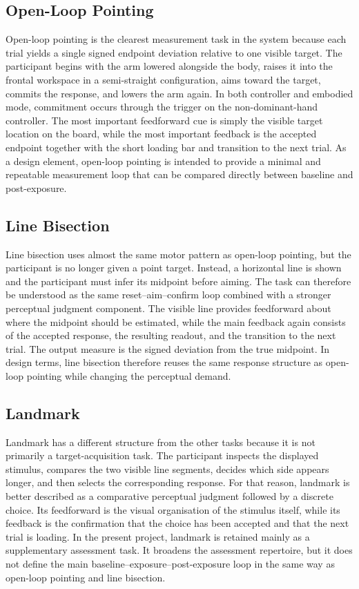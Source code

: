 \subsection{Open-Loop Pointing}
\label{subsec:open-loop-decomposition}

Open-loop pointing is the clearest measurement task in the system because each trial yields a single signed endpoint deviation relative to one visible target. The participant begins with the arm lowered alongside the body, raises it into the frontal workspace in a semi-straight configuration, aims toward the target, commits the response, and lowers the arm again. In both controller and embodied mode, commitment occurs through the trigger on the non-dominant-hand controller. The most important feedforward cue is simply the visible target location on the board, while the most important feedback is the accepted endpoint together with the short loading bar and transition to the next trial. As a design element, open-loop pointing is intended to provide a minimal and repeatable measurement loop that can be compared directly between baseline and post-exposure.

\subsection{Line Bisection}
\label{subsec:line-bisection-decomposition}

Line bisection uses almost the same motor pattern as open-loop pointing, but the participant is no longer given a point target. Instead, a horizontal line is shown and the participant must infer its midpoint before aiming. The task can therefore be understood as the same reset--aim--confirm loop combined with a stronger perceptual judgment component. The visible line provides feedforward about where the midpoint should be estimated, while the main feedback again consists of the accepted response, the resulting readout, and the transition to the next trial. The output measure is the signed deviation from the true midpoint. In design terms, line bisection therefore reuses the same response structure as open-loop pointing while changing the perceptual demand.

\subsection{Landmark}
\label{subsec:landmark-decomposition}

Landmark has a different structure from the other tasks because it is not primarily a target-acquisition task. The participant inspects the displayed stimulus, compares the two visible line segments, decides which side appears longer, and then selects the corresponding response. For that reason, landmark is better described as a comparative perceptual judgment followed by a discrete choice. Its feedforward is the visual organisation of the stimulus itself, while its feedback is the confirmation that the choice has been accepted and that the next trial is loading. In the present project, landmark is retained mainly as a supplementary assessment task. It broadens the assessment repertoire, but it does not define the main baseline--exposure--post-exposure loop in the same way as open-loop pointing and line bisection.

